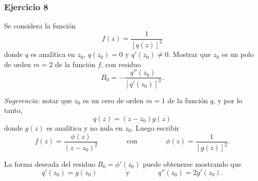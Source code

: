 \documentclass[a4paper]{report}
\begin{document}
\subsubsection{Ejercicio 8} 

Se considera la función
\[
 f(z)=\frac{1}{[q(z)]^2}
\]
donde \(q\) es analítica en \(z_0\), \(q(z_0)=0\) y \(q'(z_0)\neq0\). Mostrar que \(z_0\) es un polo de orden \(m=2\) de la función \(f\), con residuo
\begin{equation}\label{eq:residue_q_square_reciprocal}
 B_0=-\frac{q''(z_0)}{[q'(z_0)]^3}. 
\end{equation}

\emph{Sugerencia:} notar que \(z_0\) es un cero de orden \(m=1\) de la función \(q\), y por lo tanto,
\[
 q(z)=(z-z_0)g(z)
\]
donde \(g(z)\) es analítica y no nula en \(z_0\). Luego escribir
\[
 f(z)=\frac{\phi(z)}{(z-z_0)^2}
 \qquad\qquad\textrm{con}\qquad\qquad
 \phi(z)=\frac{1}{[g(z)]^2}.
\]

La forma deseada del residuo \(B_0=\phi'(z_0)\) puede obtenerse mostrando que 
\[
 q'(z_0)=g(z_0)
 \qquad\qquad\textrm{y}\qquad\qquad
 q''(z_0)=2g'(z_0).
\]
\end{document}
